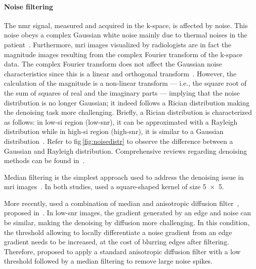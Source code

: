 \paragraph{Noise filtering} The \ac{nmr} signal, measured and acquired in the k-space, is affected by noise.
This noise obeys a complex Gaussian white noise mainly due to thermal noises in the patient~\cite{Nowak1999}.
Furthermore, \ac{mri} images visualized by radiologists are in fact the magnitude images resulting from the complex Fourier transform of the k-space data.
The complex Fourier transform does not affect the Gaussian noise characteristics since this is a linear and orthogonal transform~\cite{Nowak1999}.
However, the calculation of the magnitude is a non-linear transform --- i.e., the square root of the sum of squares of real and the imaginary parts --- implying that the noise distribution is no longer Gaussian; it indeed follows a Rician distribution making the denoising task more challenging.
Briefly, a Rician distribution is characterized as follows: in low-\ac{si} region (low-\ac{snr}), it can be approximated with a Rayleigh distribution while in high-\ac{si} region (high-\ac{snr}), it is similar to a Gaussian distribution~\cite{Manjon2008}.
Refer to \acs{fig}\,\ref{fig:noisedistr} to observe the difference between a Gaussian and Rayleigh distribution.
Comprehensive reviews regarding denoising methods can be found in~\cite{Buades2005,Mohan2014}.

Median filtering is the simplest approach used to address the denoising issue in \ac{mri} images~\cite{Ozer2009,Ozer2010}.
In both studies, \citeauthor{Ozer2010} used a square-shaped kernel of size \SI[product-units=repeat]{5x5}{\px}.%

More recently, \citeauthor{rampun2016quantitative} used a combination of median and anisotropic diffusion filter~\cite{rampun2015classifying,rampun2016computer,rampun2016computerb,rampun2016quantitative}, proposed in~\cite{ling2002smoothing}.
In low-\ac{snr} images, the gradient generated by an edge and noise can be similar, making the denoising by diffusion more challenging.
In this condition, the threshold allowing to locally differentiate a noise gradient from an edge gradient needs to be increased, at the cost of blurring edges after filtering.
Therefore, \citeauthor{ling2002smoothing} proposed to apply a standard anisotropic diffusion filter with a low threshold followed by a median filtering to remove large noise spikes.

